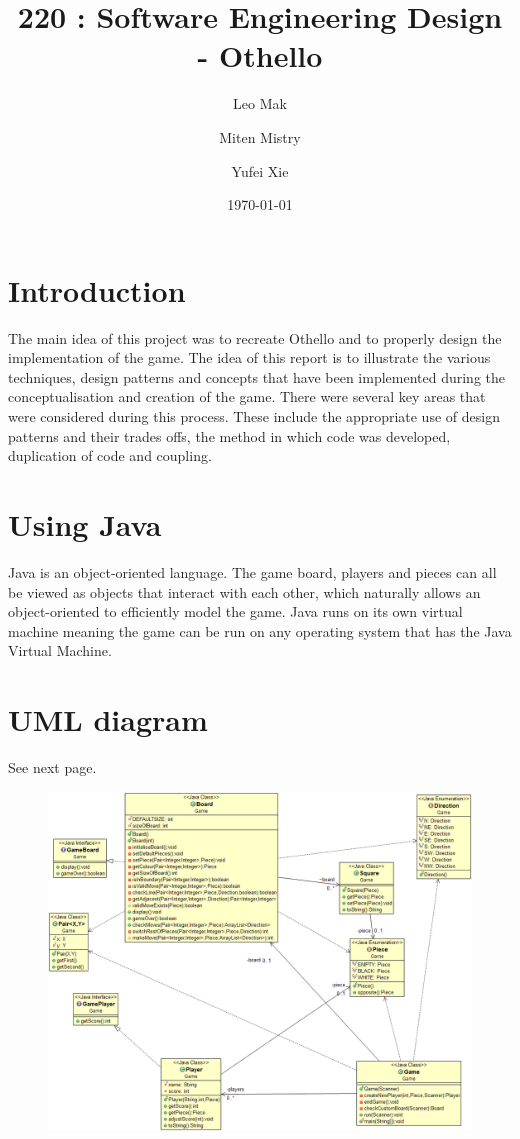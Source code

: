 \documentclass[a4wide, 11pt]{article}
\begin{document}
\title{220 : Software Engineering Design - Othello}

\author{Leo Mak \and Miten Mistry\and Yufei Xie}

\date{\today}         %

\maketitle            %

\section{Introduction}
The main idea of this project was to recreate Othello and to properly design the implementation of the game. The idea of this report is to illustrate the various techniques, design patterns and concepts that have been implemented during the conceptualisation and creation of the game. There were several key areas that were considered during this process. These include the appropriate use of design patterns and their trades offs, the method in which code was developed, duplication of code and coupling.

\section{Using Java}
Java is an object-oriented language. The game board, players and pieces can all be viewed as objects that interact with each other, which naturally allows an object-oriented to efficiently model the game. Java runs on its own virtual machine meaning the game can be run on any operating system that has the Java Virtual Machine.

\section{UML diagram}
See next page.

\begin{figure}
\centering \includegraphics[width=180mm]{umlDiagram} 
\end{figure}
\end{document}

